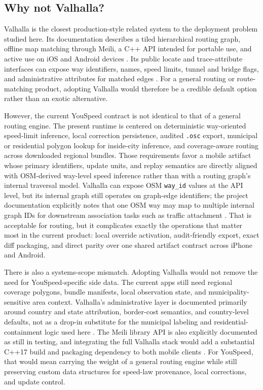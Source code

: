 \documentclass{article}
\begin{document}
\subsection{Why not Valhalla?}
Valhalla is the closest production-style related system to the deployment problem studied here. Its documentation describes a tiled hierarchical routing graph, offline map matching through Meili, a C++ API intended for portable use, and active use on iOS and Android devices \citep{valhalla_overview,valhalla_tiles,valhalla_meili}. Its public locate and trace-attribute interfaces can expose way identifiers, names, speed limits, tunnel and bridge flags, and administrative attributes for matched edges \citep{valhalla_locate_api,valhalla_map_matching_api}. For a general routing or route-matching product, adopting Valhalla would therefore be a credible default option rather than an exotic alternative.

However, the current YouSpeed contract is not identical to that of a general routing engine. The present runtime is centered on deterministic way-oriented speed-limit inference, local correction persistence, audited \texttt{.osc} export, municipal or residential polygon lookup for inside-city inference, and coverage-aware routing across downloaded regional bundles. Those requirements favor a mobile artifact whose primary identifiers, update units, and replay semantics are directly aligned with OSM-derived way-level speed inference rather than with a routing graph's internal traversal model. Valhalla can expose OSM \texttt{way\_id} values at the API level, but its internal graph still operates on graph-edge identifiers; the project documentation explicitly notes that one OSM way may map to multiple internal graph IDs for downstream association tasks such as traffic attachment \citep{valhalla_traffic_docs}. That is acceptable for routing, but it complicates exactly the operations that matter most in the current product: local override activation, audit-friendly export, exact diff packaging, and direct parity over one shared artifact contract across iPhone and Android.

There is also a systems-scope mismatch. Adopting Valhalla would not remove the need for YouSpeed-specific side data. The current apps still need regional coverage polygons, bundle manifests, local observation state, and municipality-sensitive area context. Valhalla's administrative layer is documented primarily around country and state attribution, border-cost semantics, and country-level defaults, not as a drop-in substitute for the municipal labeling and residential-containment logic used here \citep{valhalla_admins}. The Meili library API is also explicitly documented as still in testing, and integrating the full Valhalla stack would add a substantial C++17 build and packaging dependency to both mobile clients \citep{valhalla_meili_library_api,valhalla_building}. For YouSpeed, that would mean carrying the weight of a general routing engine while still preserving custom data structures for speed-law provenance, local corrections, and update control.
\end{document}
